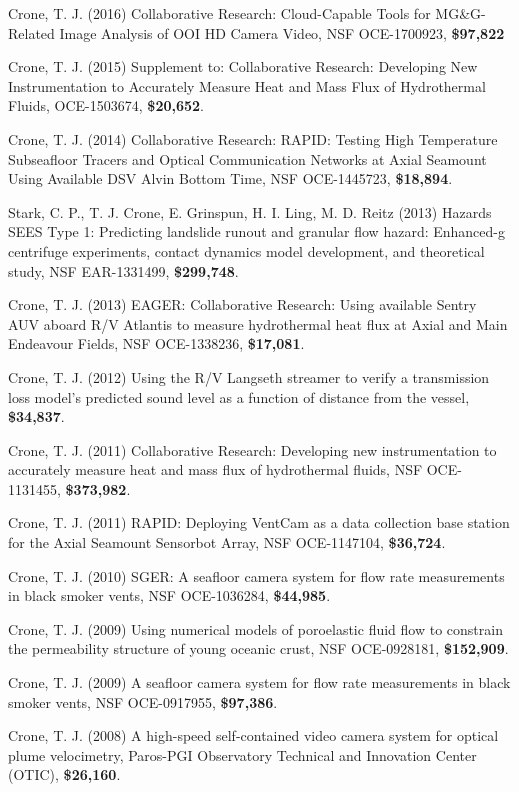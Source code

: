 \documentclass[11pt]{res}
\begin{document}
\begin{resume}
Crone, T. J. (2016) Collaborative Research: Cloud-Capable Tools for MG\&G-Related Image Analysis of OOI HD Camera Video, NSF OCE-1700923, {\bf\$97,822}

Crone, T. J. (2015) Supplement to: Collaborative Research: Developing New Instrumentation to Accurately Measure Heat and Mass Flux of Hydrothermal Fluids, OCE-1503674, {\bf\$20,652}.

Crone, T. J. (2014) Collaborative Research: RAPID: Testing High Temperature Subseafloor Tracers and Optical Communication Networks at Axial Seamount Using Available DSV Alvin Bottom Time, NSF OCE-1445723, {\bf\$18,894}.

Stark, C. P., T. J. Crone, E. Grinspun, H. I. Ling, M. D. Reitz (2013) Hazards SEES Type 1: Predicting landslide runout and granular flow hazard: Enhanced-g centrifuge experiments, contact dynamics model development, and theoretical study, NSF EAR-1331499, {\bf\$299,748}.

Crone, T. J. (2013) EAGER: Collaborative Research: Using available Sentry AUV aboard R/V Atlantis to measure hydrothermal heat flux at Axial and Main Endeavour Fields, NSF OCE-1338236, {\bf\$17,081}.

Crone, T. J. (2012) Using the R/V Langseth streamer to verify a transmission loss model's predicted sound level as a function of distance from the vessel, {\bf\$34,837}. 

Crone, T. J. (2011) Collaborative Research: Developing new instrumentation to accurately measure heat and mass flux of hydrothermal fluids, NSF OCE-1131455, {\bf\$373,982}.

Crone, T. J. (2011) RAPID: Deploying VentCam as a data collection base station for the Axial Seamount Sensorbot Array, NSF OCE-1147104, {\bf\$36,724}.

Crone, T. J. (2010) SGER: A seafloor camera system for flow rate measurements in black smoker vents, NSF OCE-1036284, {\bf\$44,985}.

Crone, T. J. (2009) Using numerical models of poroelastic fluid flow to constrain the permeability structure of young oceanic crust, NSF OCE-0928181, {\bf\$152,909}.

Crone, T. J. (2009) A seafloor camera system for flow rate measurements in black smoker vents, NSF OCE-0917955, {\bf\$97,386}.

Crone, T. J. (2008) A high-speed self-contained video camera system for optical plume velocimetry, Paros-PGI Observatory Technical and Innovation Center (OTIC), {\bf\$26,160}.


\end{resume}
\end{document}
